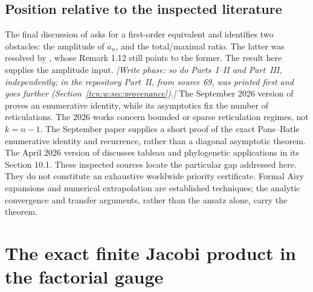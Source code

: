 \documentclass[11pt,letterpaper]{article}
\theoremstyle{remark}
\begin{document}
\subsection{Position relative to the inspected literature}\label{tcn:w:sec:position}
The final discussion of \cite{FYZ2021} asks for a first-order equivalent and identifies two obstacles: the amplitude of $a_n$, and the total/maximal ratio. The latter was resolved by \cite{Chang2024}, whose Remark 1.12 still points to the former. The result here supplies the amplitude input. \emph{[Write phase: so do Parts~I--II and Part~III, independently; in the repository Part~II, from source 69, was printed first and goes further (Section~\ref{tcn:w:sec:provenance}).]}
The September 2026 version of \cite{LL2026} proves an enumerative identity, while its asymptotics fix the number of reticulations. The 2026 works \cite{LWY2026,YZ2026,FY2026} concern bounded or sparse reticulation regimes, not $k=n-1$. The September paper \cite{YZ2026short} supplies a short proof of the exact Pons--Batle enumerative identity and recurrence, rather than a diagonal asymptotic theorem. The April 2026 version of \cite{EFLW2026} discusses tableau and phylogenetic applications in its Section 10.1. These inspected sources locate the particular gap addressed here. They do not constitute an exhaustive worldwide priority certificate. Formal Airy expansions and numerical extrapolation are established techniques; the analytic convergence and transfer arguments, rather than the ansatz alone, carry the theorem.

\section{The exact finite Jacobi product in the factorial gauge}\label{tcn:w:sec:jacobi}
\end{document}
